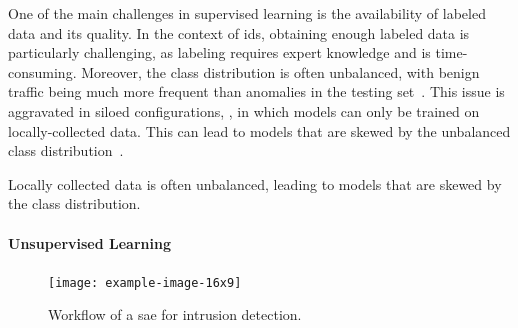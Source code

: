 
One of the main challenges in supervised learning is the availability of labeled data and its quality.
In the context of \gls{ids}, obtaining enough labeled data is particularly challenging, as labeling requires expert knowledge and is time-consuming.
Moreover, the class distribution is often unbalanced, with benign traffic being much more frequent than anomalies in the testing set~\cite{chandola_Anomalydetectionsurvey_2009}.
This issue is aggravated in siloed configurations, \ie, in which models can only be trained on locally-collected data.
This can lead to models that are skewed by the unbalanced class distribution~\cite{campos_EvaluatingFederatedLearning_2022}.

\begin{challenge}
  Locally collected data is often unbalanced, leading to models that are skewed by the class distribution.
  \label{chall:bias}
\end{challenge}


\paragraph{Unsupervised Learning}

\begin{figure}
  \centering
  \texttt{[image: example-image-16x9]}
  \caption{
    Workflow of a \acrfull{sae} for intrusion detection.
    \label{fig:bg.mlp}
  }
\end{figure}


